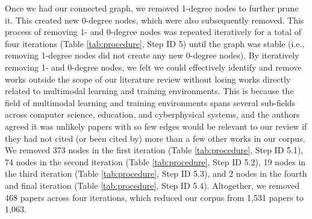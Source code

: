 \documentclass[manuscript,screen,review]{acmart}
\begin{document}
Once we had our connected graph, we removed 1-degree nodes to further prune it. This created new 0-degree nodes, which were also subsequently removed. This process of removing 1- and 0-degree nodes was repeated iteratively for a total of four iterations (Table \ref{tab:procedure}, Step ID 5) until the graph was stable (i.e., removing 1-degree nodes did not create any new 0-degree nodes). By iteratively removing 1- and 0-degree nodes, we felt we could effectively identify and remove works outside the scope of our literature review without losing works directly related to multimodal learning and training environments. This is because the field of multimodal learning and training environments spans several sub-fields across computer science, education, and cyberphysical systems, and the authors agreed it was unlikely papers with so few edges would be relevant to our review if they had not cited (or been cited by) more than a few other works in our corpus. We removed 373 nodes in the first iteration (Table \ref{tab:procedure}, Step ID 5.1), 74 nodes in the second iteration (Table \ref{tab:procedure}, Step ID 5.2), 19 nodes in the third iteration (Table \ref{tab:procedure}, Step ID 5.3), and 2 nodes in the fourth and final iteration (Table \ref{tab:procedure}, Step ID 5.4). Altogether, we removed 468 papers across four iterations, which reduced our corpus from 1,531 papers to 1,063. 
\end{document}
